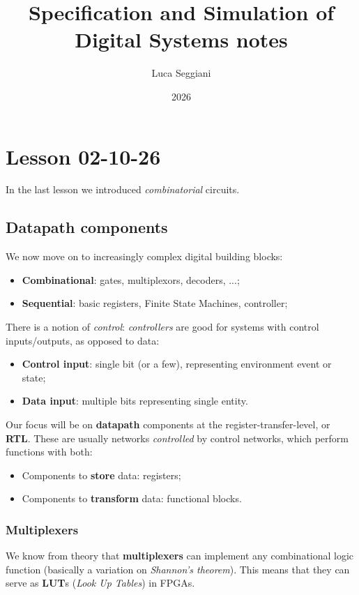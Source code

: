 \documentclass[a4paper,11pt]{article}
\title{Specification and Simulation of Digital Systems notes}
\author{Luca Seggiani}
\date{2026}
\begin{document}
\section{Lesson 02-10-26}

\thispagestyle{empty}
\pagestyle{fancy}

In the last lesson we introduced \textit{combinatorial} circuits.

\subsection{Datapath components}

We now move on to increasingly complex digital building blocks:
\begin{itemize}
	\item \textbf{Combinational}: gates, multiplexors, decoders, ...;
	\item \textbf{Sequential}: basic registers, Finite State Machines, controller;
\end{itemize}

There is a notion of \textit{control}: \textit{controllers} are good for systems with control inputs/outputs, as opposed to data:
\begin{itemize}
	\item \textbf{Control input}: single bit (or a few), representing environment event or state;
	\item \textbf{Data input}: multiple bits representing single entity.
\end{itemize}

Our focus will be on \textbf{datapath} components at the register-transfer-level, or \textbf{RTL}.
These are usually networks \textit{controlled} by control networks, which perform functions with both:
\begin{itemize}
	\item Components to \textbf{store} data: registers;
	\item Components to \textbf{transform} data: functional blocks.
\end{itemize}

\subsubsection{Multiplexers}

We know from theory that \textbf{multiplexers} can implement any combinational logic function (basically a variation on \textit{Shannon's theorem}).
This means that they can serve as \textbf{LUT}s (\textit{Look Up Tables}) in FPGAs.
\end{document}
